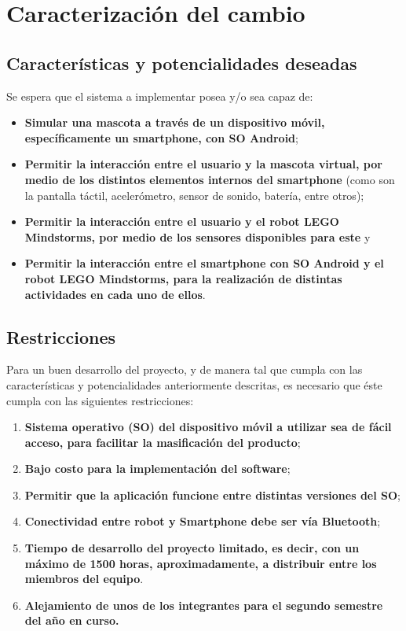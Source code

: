 \newpage
\section{Caracterizaci\'on del cambio}
\subsection{Caracter\'isticas y potencialidades deseadas}

Se espera que el sistema a implementar posea y/o sea capaz de:
\begin{itemize}
\item {\bf Simular una mascota a trav\'es de un dispositivo m\'ovil, espec\'ificamente un smartphone, con SO Android};
\item {\bf Permitir la interacci\'on entre el usuario y la mascota virtual, por medio de los distintos elementos internos del smartphone} (como son la pantalla t\'actil, a\-ce\-le\-r\'o\-me\-tro, sensor de sonido, bater\'ia, entre otros);
\item {\bf Permitir la interacci\'on entre el usuario y el robot LEGO Mindstorms, por medio de los sensores disponibles para este} y
\item {\bf Permitir la interacci\'on entre el smartphone con SO Android y el robot LEGO Mindstorms, para la realizaci\'on de distintas actividades en cada uno de ellos}.
\end{itemize}

\subsection{Restricciones}

Para un buen desarrollo del proyecto, y de manera tal que cumpla con las caracter\'isticas y potencialidades anteriormente descritas, es necesario que \'este cumpla con las siguientes restricciones:
\begin{enumerate}
\item {\bf Sistema operativo (SO) del dispositivo m\'ovil a utilizar sea de f\'acil acceso, para facilitar la masificaci\'on del producto};
\item {\bf Bajo costo para la implementaci\'on del software};
\item {\bf Permitir que la aplicaci\'on funcione entre distintas versiones del SO};
\item {\bf Conectividad entre robot y Smartphone debe ser v\'ia Bluetooth};
\item {\bf Tiempo de desarrollo del proyecto limitado, es decir, con un m\'aximo de 1500 horas, aproximadamente, a distribuir entre los miembros del equipo}.
\item {\bf Alejamiento de unos de los integrantes para el segundo semestre del a\~no en curso.}
\end{enumerate}

